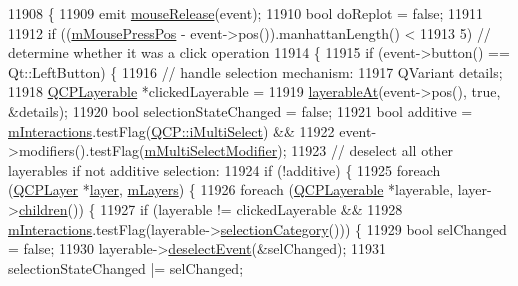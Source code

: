 \begin{DoxyCode}
11908                                                       \{
11909   emit \hyperlink{class_q_custom_plot_ac8dc0ee6bb98e923c00b4ebafbe6134d}{mouseRelease}(event);
11910   \textcolor{keywordtype}{bool} doReplot = \textcolor{keyword}{false};
11911 
11912   \textcolor{keywordflow}{if} ((\hyperlink{class_q_custom_plot_ac57090da95056ae4dd67be67adfa85bd}{mMousePressPos} - event->pos()).manhattanLength() <
11913       5) \textcolor{comment}{// determine whether it was a click operation}
11914   \{
11915     \textcolor{keywordflow}{if} (event->button() == Qt::LeftButton) \{
11916       \textcolor{comment}{// handle selection mechanism:}
11917       QVariant details;
11918       \hyperlink{class_q_c_p_layerable}{QCPLayerable} *clickedLayerable =
11919           \hyperlink{class_q_custom_plot_a3fffd1d8364f657482ae985e0b5aa028}{layerableAt}(event->pos(), \textcolor{keyword}{true}, &details);
11920       \textcolor{keywordtype}{bool} selectionStateChanged = \textcolor{keyword}{false};
11921       \textcolor{keywordtype}{bool} additive = \hyperlink{class_q_custom_plot_ad717377ceba7493b4b32f0bcbbdf1895}{mInteractions}.testFlag(\hyperlink{namespace_q_c_p_a2ad6bb6281c7c2d593d4277b44c2b037aef673112c5067c3cf4cfddb62da7265d}{QCP::iMultiSelect}) &&
11922                       \textcolor{keyword}{event}->modifiers().testFlag(\hyperlink{class_q_custom_plot_a0e97e701c5671e7e463d2ce0211d0f8a}{mMultiSelectModifier});
11923       \textcolor{comment}{// deselect all other layerables if not additive selection:}
11924       \textcolor{keywordflow}{if} (!additive) \{
11925         \textcolor{keywordflow}{foreach} (\hyperlink{class_q_c_p_layer}{QCPLayer} *\hyperlink{class_q_custom_plot_aac492da01782820454e9136a8db28182}{layer}, \hyperlink{class_q_custom_plot_a9685e7ec1ef5e6066dd7d91bb3a698b3}{mLayers}) \{
11926           \textcolor{keywordflow}{foreach} (\hyperlink{class_q_c_p_layerable}{QCPLayerable} *layerable, layer->\hyperlink{class_q_c_p_layer_a94c2f0100e48cefad2de8fe0fbb03c27}{children}()) \{
11927             \textcolor{keywordflow}{if} (layerable != clickedLayerable &&
11928                 \hyperlink{class_q_custom_plot_ad717377ceba7493b4b32f0bcbbdf1895}{mInteractions}.testFlag(layerable->\hyperlink{class_q_c_p_layerable_aa4035e586b7f317a06ba7e74e242a5ea}{selectionCategory}())) \{
11929               \textcolor{keywordtype}{bool} selChanged = \textcolor{keyword}{false};
11930               layerable->\hyperlink{class_q_c_p_layerable_ae546370644a5551c76af739afc008bee}{deselectEvent}(&selChanged);
11931               selectionStateChanged |= selChanged;

\end{DoxyCode}
